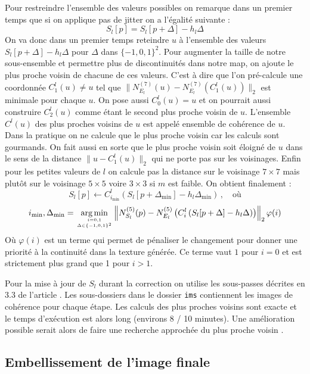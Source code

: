 \documentclass[12pt]{article}
\DeclareMathOperator*{\argmin}{arg\,min}
\begin{document}
Pour restreindre l'ensemble des valeurs possibles on remarque dans un premier temps que si on applique pas de jitter on a l'égalité suivante :
$$ S_l[p] = S_l \left[ p + \Delta \right] - h_l \Delta $$
On va donc dans un premier temps reteindre $u$ à l'ensemble des valeurs $S_l \left[ p + \Delta \right] - h_l \Delta$ pour $\Delta$ dans $\{ -1, 0, 1 \}^2$. Pour augmenter la taille de notre sous-ensemble et permettre plus de discontinuités dans notre map, on ajoute le plus proche voisin de chacune de ces valeurs. C'est à dire que l'on pré-calcule une coordonnée $C_1^l(u) \neq u$ tel que $ \| N_{E_l}^{(7)}(u) - N_{E_l}^{(7)}(C_1^l(u)) \|_2 $ est minimale pour chaque $u$. On pose aussi $C_0^l(u) = u$ et on pourrait aussi construire $C_
2^l(u)$ comme étant le second plus proche voisin de $u$. L'ensemble $C^l(u)$ des plus proches voisins de $u$ est appelé ensemble de cohérence de $u$. Dans la pratique on ne calcule que le plus proche voisin car les calculs sont gourmands. On fait aussi en sorte que le plus proche voisin soit éloigné de $u$ dans le sens de la distance $\| u - C_1^l(u) \|_2$ qui ne porte pas sur les voisinages. Enfin pour les petites valeurs de $l$ on calcule pas la distance sur le voisinage $7 \times 7$ mais plutôt sur le voisinage $5 \times 5$ voire $3 \times 3$ si $m$ est faible. On obtient finalement :
$$ S_l[p] \gets C_{i_{\min}}^l \left( S_l \left[ p + \Delta_{\min} \right] - h_l \Delta_{\min} \right) \, , \quad \text{où} $$
$$ i_{\min}, \Delta_{\min} = \argmin_{i = 0, 1 \atop \Delta \in \{ -1, 0, 1 \}^2} \left\| N_{S_l}^{(5)}(p) - N_{E_l}^{(5)} \left( C_i^l \left( S_l[p + \Delta] - h_l \Delta \right) \right) \right\|_2 \varphi(i) $$
Où $\varphi(i)$ est un terme qui permet de pénaliser le changement pour donner une priorité à la continuité dans la texture générée. Ce terme vaut $1$ pour $i = 0$ et est strictement plus grand que 1 pour $i > 1$.

Pour la mise à jour de $S_l$ durant la correction on utilise les sous-passes décrites en 3.3 de l'article \cite{Lef++}. Les sous-dossiers dans le dossier \verb|ims| contiennent les images de cohérence pour chaque étape. Les calculs des plus proches voisins sont exacte et le temps d'exécution est alors long (environs 8 / 10 minutes). Une amélioration possible serait alors de faire une recherche approchée du plus proche voisin \cite{Ary++}.

\subsection{Embellissement de l'image finale}
\end{document}
